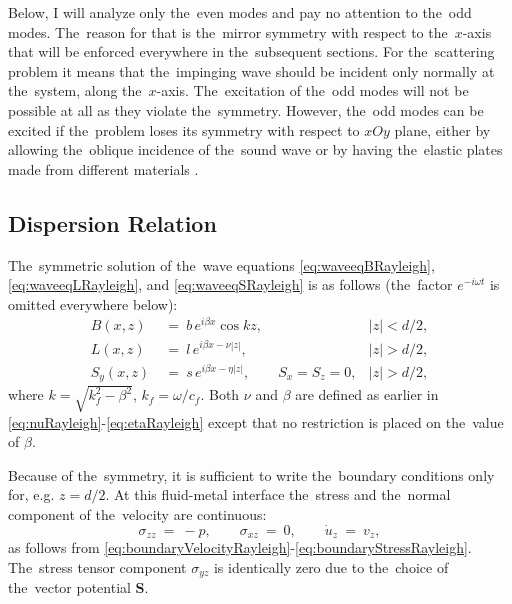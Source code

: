 Below, I will analyze only the~even modes and pay no attention to the~odd modes.
The~reason for that is the~mirror symmetry with respect to the~$x$-axis that will be enforced everywhere in the~subsequent sections.
For the~scattering problem it means that the~impinging wave should be incident only normally at the~system, along the~$x$-axis.
The~excitation of the~odd modes will not be possible at all as they violate the~symmetry.
However, the~odd modes can be excited if the~problem loses its symmetry with respect to $xOy$ plane, either by allowing the~oblique incidence of the~sound wave or by having the~elastic plates made from different materials \cite{channel1}.

\subsection{Dispersion Relation}

The~symmetric solution of the~wave equations \cref{eq:waveeqBRayleigh}, \cref{eq:waveeqLRayleigh}, and \cref{eq:waveeqSRayleigh} is as follows (the~factor $e^{-i\omega t}$ is omitted everywhere below):
\begin{align}
B(x,z)~&=~b\,e^{i\beta x}\cos{kz}, &|z| < d/2, \label{eq:potBcoupledRayleigh}\\
L(x,z)~&=~l\,e^{i\beta x-\nu|z|}, &|z| > d/2, \label{eq:potLcoupledRayleigh}\\
S_y(x,z)~&=~s\,e^{i\beta x-\eta|z|}, \qquad S_x=S_z=0, &|z| > d/2, \label{eq:potScoupledRayleigh}
\end{align}
where $k=\sqrt{k_f^2-\beta^2}$, $k_f=\omega/c_f$.
Both $\nu$ and $\beta$ are defined as earlier in \cref{eq:nuRayleigh}-\cref{eq:etaRayleigh} except that no restriction is placed on the~value of $\beta$.

Because of the~symmetry, it is sufficient to write the~boundary conditions only for, e.g. $z=d/2$.
At this fluid-metal interface the~stress and the~normal component of the~velocity are continuous:
\begin{equation}
\sigma_{zz}~=~-p, \qquad \sigma_{xz}~=~0, \qquad \dot{u}_z~=~v_z,
\end{equation}
as follows from \cref{eq:boundaryVelocityRayleigh}-\cref{eq:boundaryStressRayleigh}.
The~stress tensor component $\sigma_{yz}$ is identically zero due to the~choice of the~vector potential $\mathbf{S}$.

